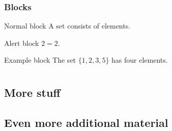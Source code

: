 \documentclass[11pt]{beamer}
\begin{document}
\begin{frame}
  \frametitle{Blocks}

  \begin{block}{Normal block}
A \alert{set} consists of elements.
\end{block}

\begin{alertblock}{Alert block}
$2=2$.
\end{alertblock}

\begin{exampleblock}{Example block}
The set $\{1,2,3,5\}$ has four elements.
\end{exampleblock}

\end{frame}

\appendix

\section{\appendixname}

\subsection{More stuff}

\subsection{Even more additional material}
\end{document}
